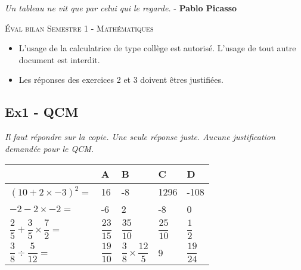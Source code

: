 



\begin{center}
  \textit{Un tableau ne vit que par celui qui le regarde.} - \textbf{Pablo Picasso}
\end{center}

{\Large \textsc{Éval bilan Semestre 1 - Mathématiques}}

\begin{itemize}
    \item L'usage de la calculatrice de type collège est autorisé. L'usage de tout autre document est interdit. 
    \item Les réponses des exercices 2 et 3 doivent êtres justifiées.
  \end{itemize}

\horrule{2px}

\subsection*{Ex1 - QCM}

\textit{Il faut répondre sur la copie. Une seule réponse juste. Aucune justification demandée pour le QCM.}

\begin{center} \renewcommand{\arraystretch}{2.5} \begin{tabular}{|p{3cm}|p{2cm}|p{2cm}|p{2cm}|p{2cm}|}  \hline
      & A & B & C & D \\ \hline
  $(10 + 2 \times -3)^2 =$  & 16 & -8 & 1296 & -108 \\ \hline
  $-2 -2 \times -2 =$       & -6 &  2 &   -8 & 0  \\ \hline
  $\dfrac{2}{5} + \dfrac{3}{5} \times \dfrac{7}{2} =$ & $\dfrac{23}{15}$ & $\dfrac{35}{10}$ & $\dfrac{25}{10}$ & $\dfrac{1}{2} $ \\ \hline
  $\dfrac{3}{8} \div \dfrac{5}{12} =$ & $ \dfrac{19}{10} $ & $ \dfrac{3}{8} \times \dfrac{12}{5} $ & 9 & $ \dfrac{19}{24} $  \\ \hline
\end{tabular} \end{center}

